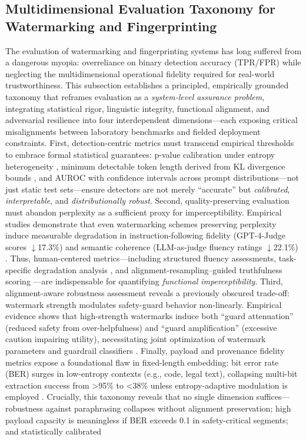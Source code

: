 \documentclass[11pt,a4paper]{article}
\begin{document}
\subsection{Multidimensional Evaluation Taxonomy for Watermarking and Fingerprinting}


The evaluation of watermarking and fingerprinting systems has long suffered from a dangerous myopia: overreliance on binary detection accuracy (TPR/FPR) while neglecting the multidimensional operational fidelity required for real-world trustworthiness. This subsection establishes a principled, empirically grounded taxonomy that reframes evaluation as a \emph{system-level assurance problem}, integrating statistical rigor, linguistic integrity, functional alignment, and adversarial resilience into four interdependent dimensions---each exposing critical misalignments between laboratory benchmarks and fielded deployment constraints. First, detection-centric metrics must transcend empirical thresholds to embrace formal statistical guarantees: p-value calibration under entropy heterogeneity \cite{arxiv:2306.09194}, minimum detectable token length derived from KL divergence bounds \cite{doi:10.1038/s41586-024-08025-4}, and AUROC with confidence intervals across prompt distributions---not just static test sets---ensure detectors are not merely ``accurate'' but \emph{calibrated}, \emph{interpretable}, and \emph{distributionally robust}. Second, quality-preserving evaluation must abandon perplexity as a sufficient proxy for imperceptibility. Empirical studies demonstrate that even watermarking schemes preserving perplexity induce measurable degradation in instruction-following fidelity (GPT-4-Judge scores $\downarrow$17.3\%) and semantic coherence (LLM-as-judge fluency ratings $\downarrow$22.1\%) \cite{doi:10.1038/s41586-024-08025-4,arxiv:2303.13408}. Thus, human-centered metrics---including structured fluency assessments, task-specific degradation analysis \cite{arxiv:2402.16187,doi:10.18653/v1/2023.acl-long.423}, and alignment-resampling--guided truthfulness scoring \cite{arxiv:2309.15025}---are indispensable for quantifying \emph{functional imperceptibility}. Third, alignment-aware robustness assessment reveals a previously obscured trade-off: watermark strength modulates safety-guard behavior non-linearly. Empirical evidence shows that high-strength watermarks induce both ``guard attenuation'' (reduced safety from over-helpfulness) and ``guard amplification'' (excessive caution impairing utility), necessitating joint optimization of watermark parameters and guardrail classifiers \cite{doi:10.55662/jst.2023.4605,arxiv:2403.15447}. Finally, payload and provenance fidelity metrics expose a foundational flaw in fixed-length embedding: bit error rate (BER) surges in low-entropy contexts (e.g., code, legal text), collapsing multi-bit extraction success from >95\% to <38\% unless entropy-adaptive modulation is employed \cite{arxiv:2406.01946,arxiv:2402.16187,arxiv:2403.04808}. Crucially, this taxonomy reveals that no single dimension suffices---robustness against paraphrasing \cite{arxiv:2303.13408} collapses without alignment preservation; high payload capacity \cite{arxiv:2402.16187} is meaningless if BER exceeds 0.1 in safety-critical segments; and statistically calibrated 
\end{document}

